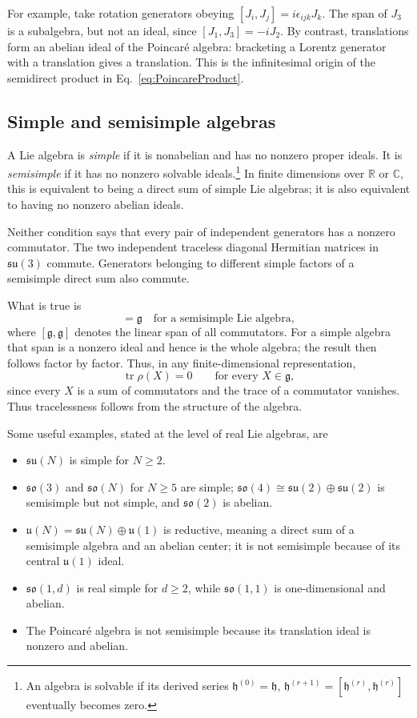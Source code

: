 \documentclass[11pt]{article}
\newcommand{\R}{\mathbb{R}}
\newcommand{\C}{\mathbb C}
\newcommand{\tr}{\operatorname{tr}}
\newcommand{\lieg}{\mathfrak g}
\newcommand{\lieh}{\mathfrak h}
\newcommand{\su}{\mathfrak{su}}
\newcommand{\so}{\mathfrak{so}}
\begin{document}
For example, take rotation generators obeying
\([J_i,J_j]=i\epsilon_{ijk}J_k\). The span of \(J_3\) is a subalgebra,
but not an ideal, since \([J_1,J_3]=-iJ_2\).
By contrast, translations form an abelian ideal of the Poincar\'e algebra:
bracketing a Lorentz generator with a translation gives a translation.
This is the infinitesimal origin of the semidirect product in
Eq.~\eqref{eq:PoincareProduct}.

\subsection{Simple and semisimple algebras}
A Lie algebra is \emph{simple} if it is nonabelian and has no nonzero
proper ideals. It is \emph{semisimple} if it has no nonzero solvable
ideals.\footnote{An algebra is solvable if its derived series
\(\lieh^{(0)}=\lieh\), \(\lieh^{(r+1)}=[\lieh^{(r)},\lieh^{(r)}]\)
eventually becomes zero.} In finite dimensions over \(\R\) or \(\C\),
this is equivalent
to being a direct sum of simple Lie algebras; it is also equivalent to
having no nonzero abelian ideals.

Neither condition says that every pair of independent generators has
a nonzero commutator. The two independent traceless diagonal Hermitian
matrices in \(\su(3)\) commute. Generators belonging to different simple
factors of a semisimple direct sum also commute.

What is true is
\begin{equation}
 [\lieg,\lieg]=\lieg
 \quad\text{for a semisimple Lie algebra},
 \label{eq:perfect}
\end{equation}
where \([\lieg,\lieg]\) denotes the linear span of all commutators.
For a simple algebra that span is a nonzero ideal and hence is the whole
algebra; the result then follows factor by factor. Thus, in any
finite-dimensional representation,
\begin{equation}
 \tr\rho(X)=0\qquad\text{for every }X\in\lieg,
 \label{eq:semisimple-trace}
\end{equation}
since every \(X\) is a sum of commutators and the trace of a commutator
vanishes. Thus tracelessness follows from the structure of the algebra.

Some useful examples, stated at the level of real Lie algebras, are
\begin{itemize}
\item \(\su(N)\) is simple for \(N\geq2\).
\item \(\so(3)\) and \(\so(N)\) for \(N\geq5\) are simple;
\(\so(4)\cong\su(2)\oplus\su(2)\) is semisimple but not simple,
and \(\so(2)\) is abelian.
\item \(\mathfrak u(N)=\su(N)\oplus\mathfrak u(1)\) is reductive,
meaning a direct sum of a semisimple algebra and an abelian center;
it is not semisimple because of its central \(\mathfrak u(1)\) ideal.
\item \(\so(1,d)\) is real simple for \(d\geq2\), while
\(\so(1,1)\) is one-dimensional and abelian.
\item The Poincar\'e algebra is not semisimple because its translation
ideal is nonzero and abelian.
\end{itemize}
\end{document}
